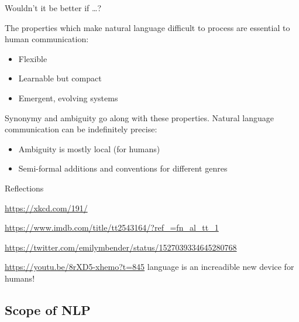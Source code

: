 \documentclass[compress]{beamer}
\begin{document}
\begin{frame}{Wouldn't it be better if \ldots?}

The properties which make natural language difficult to process are essential
to human communication:
\begin{itemize}
\item Flexible 
\item Learnable but compact 
\item Emergent, evolving systems
\end{itemize}
Synonymy and ambiguity go along with these properties.
\pause
Natural language communication can be indefinitely precise:
\begin{itemize}
\item Ambiguity is mostly local (for humans)
\item Semi-formal additions and conventions for different genres
\end{itemize}
\end{frame} 


\begin{frame}{Reflections}

  \url{https://xkcd.com/191/}

  \url{https://www.imdb.com/title/tt2543164/?ref_=fn_al_tt_1}

  \url{https://twitter.com/emilymbender/status/1527039334645280768}

  \url{https://youtu.be/8rXD5-xhemo?t=845} language is an increadible
  new device for humans!

\end{frame}

\subsection{Scope of NLP}
\end{document}
